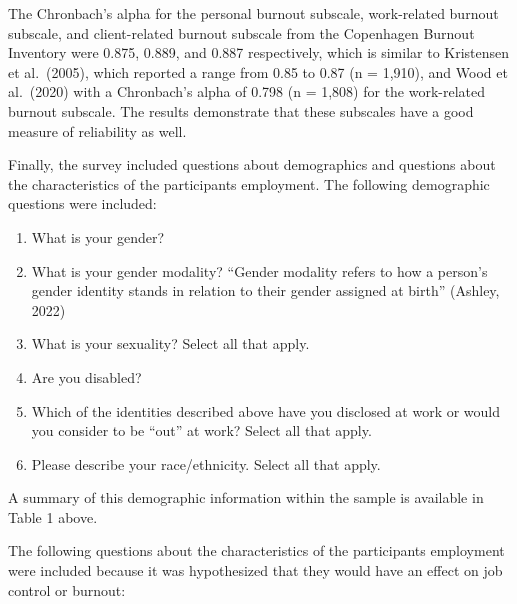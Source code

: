 \documentclass[
  twocolumn]{article}
\providecommand{\tightlist}{%
  \setlength{\itemsep}{0pt}\setlength{\parskip}{0pt}}
\begin{document}
The Chronbach's alpha for the personal burnout subscale, work-related
burnout subscale, and client-related burnout subscale from the
Copenhagen Burnout Inventory were 0.875, 0.889, and 0.887 respectively,
which is similar to Kristensen et al.~(2005), which reported a range
from 0.85 to 0.87 (n = 1,910), and Wood et al.~(2020) with a Chronbach's
alpha of 0.798 (n = 1,808) for the work-related burnout subscale. The
results demonstrate that these subscales have a good measure of
reliability as well.

Finally, the survey included questions about demographics and questions
about the characteristics of the participants employment. The following
demographic questions were included:

\begin{enumerate}
\def\labelenumi{\arabic{enumi}.}
\tightlist
\item
  What is your gender?
\item
  What is your gender modality? ``Gender modality refers to how a
  person's gender identity stands in relation to their gender assigned
  at birth'' (Ashley, 2022)
\item
  What is your sexuality? Select all that apply.
\item
  Are you disabled?
\item
  Which of the identities described above have you disclosed at work or
  would you consider to be ``out'' at work? Select all that apply.
\item
  Please describe your race/ethnicity. Select all that apply.
\end{enumerate}

A summary of this demographic information within the sample is available
in Table 1 above.

The following questions about the characteristics of the participants
employment were included because it was hypothesized that they would
have an effect on job control or burnout:
\end{document}
